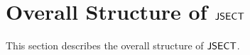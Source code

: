 \section{Overall Structure of $\text{\sf JSECT}$}\label{sec:overall}

This section describes the overall structure of $\text{\sf JSECT}$.

